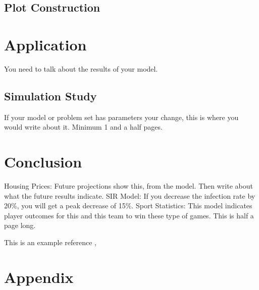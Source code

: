 \documentclass[12pt, centerh1]{article}
\begin{document}
\subsection{Plot Construction}
\newpage
\section{Application}
You need to talk about the results of your model. 
\subsection{Simulation Study}
If your model or problem set has parameters your change, this is where you would write about it. 
Minimum 1 and a half pages. 

\section{Conclusion}
Housing Prices: Future projections show this, from the model. Then write about what the future results indicate. 
SIR Model: If you decrease the infection rate by 20\%, you will get a peak decrease of 15\%. 
Sport Statistics: This model indicates player outcomes for this and this team to win these type of games. 
This is half a page long. 

This is an example reference \cite{pocuca2020}, 




\newpage
\mbox{}
\printnomenclature
\newpage
\section*{Appendix}
\end{document}
